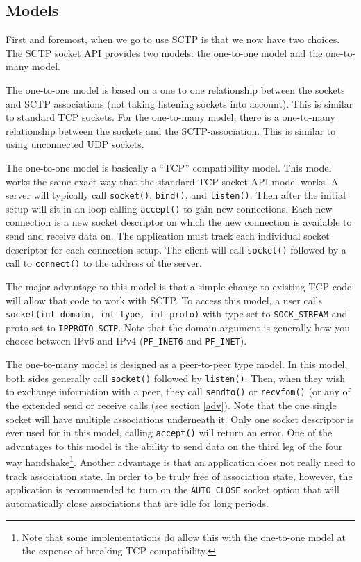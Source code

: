 \documentclass[conference]{IEEEtran}
\begin{document}
\subsection{Models}
First and foremost, when we go to use SCTP is that we now have two choices.
The SCTP socket API provides two models: the one-to-one model and the
one-to-many model.

The one-to-one model is based on a one to one relationship between the sockets and
SCTP associations (not taking listening sockets into account). This is similar to
standard TCP sockets.
For the one-to-many model, there is a one-to-many relationship between the sockets
and the SCTP-association. This is similar to using unconnected UDP sockets.

The one-to-one model is basically a ``TCP'' compatibility model. This model
works the same exact way that the standard TCP socket API model works.
A server will typically call \texttt{socket()}, \texttt{bind()}, and \texttt{listen()}. Then after
the initial setup will sit in an loop calling \texttt{accept()} to gain new connections.
Each new connection is a new socket descriptor on which the new connection is
available to send and receive data on. The application must track each individual socket
descriptor for each connection setup.  The client will call \texttt{socket()} followed
by a call to \texttt{connect()} to the address of the server. 

The major advantage to this model is that a simple change to 
existing TCP code will allow that code to work with SCTP. To access this model, a user
calls \texttt{socket(int domain,  int type, int proto)}
with type set to \texttt{SOCK\_STREAM} and proto set to \texttt{IPPROTO\_SCTP}. 
Note that the domain argument is generally how you choose between IPv6 
and IPv4 (\texttt{PF\_INET6} and \texttt{PF\_INET}).

The one-to-many model is designed as a peer-to-peer type model.
In this model, both sides generally call \texttt{socket()} followed by \texttt {listen()}.
Then, when they wish to exchange information
with a peer, they call \texttt{sendto()} or \texttt{recvfom()} (or any of the extended send or
receive calls (see section \ref{adv}). Note that the one single socket will have multiple
associations underneath it. Only one socket descriptor is ever used for
in this model, calling \texttt{accept()} will return an error.
One of the advantages to this model is the ability to send data on the third leg
of the four way handshake\footnote{Note that some implementations do allow this with
the one-to-one model at the expense of breaking TCP compatibility.}.
Another advantage is that an application does not really need to track association state.
In order to be truly free of association state, however, the application is recommended
to turn on the \texttt{AUTO\_CLOSE} socket option that will automatically close associations
that are idle for long periods. 
\end{document}
